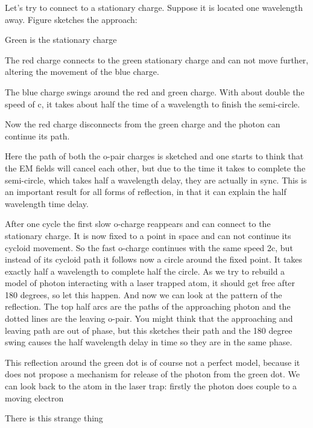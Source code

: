 Let's try to connect to a stationary charge. Suppose it is located one wavelength away. Figure sketches the approach:

Green is the stationary charge

The red charge connects to the green stationary charge and can not move further, altering the movement of the blue charge.



The blue charge swings around the red and green charge. With about double the speed of c, it takes about half the time of a wavelength to finish the semi-circle.

Now the red charge disconnects from the green charge and the photon can continue its path.






Here the path of both the o-pair charges is sketched and one starts to think that the EM fields will cancel each other, but due to the time it takes to complete the semi-circle, which takes half a wavelength delay, they are actually in sync. This is an important result for all forms of reflection, in that it can explain the half wavelength time delay.

After one cycle the first slow o-charge reappears and can connect to the stationary charge. It is now fixed to a point in space and can not continue its cycloid movement. So the fast o-charge continues with the same speed 2c, but instead of its cycloid path it follows now a circle around the fixed point. It takes exactly half a wavelength to complete half the circle.
As we try to rebuild a model of photon interacting with a laser trapped atom, it should get free after 180 degrees, so let this happen. And now we can look at the pattern of the reflection. The top half arcs are the paths of the approaching photon and the dotted lines are the leaving o-pair. You might think that the approaching and leaving path are out of phase, but this sketches their path and the 180 degree swing causes the half wavelength delay in time so they are in the same phase.

This reflection around the green dot is of course not a perfect model, because it does not propose a mechanism for release of the photon from the green dot. We can look back to the atom in the laser trap: firstly the photon does couple to a moving electron

There is this strange thing





